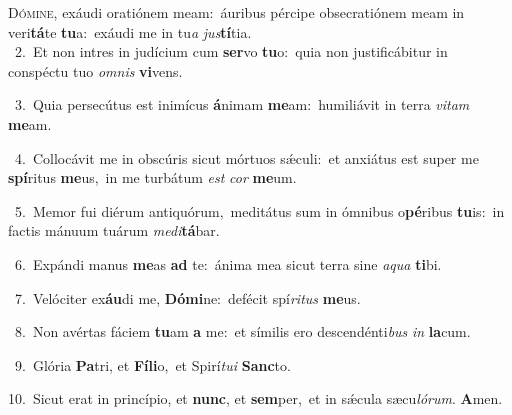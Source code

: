 \lettrine{\initial\textcolor{\initialcolor}{D}}{ómine,} exáudi oratiónem meam:~\dagger áuribus pércipe obsecratiónem meam in veri\-\textbf{tá}\-te \textbf{tu}\-a:~\star exáudi me in tu\textit{a} \textit{jus}\-\textbf{tí}tia.\\
{\numbfont\textcolor{\numbcolor}{~2.}}~Et non intres in judícium cum \textbf{ser}\-vo \textbf{tu}\-o:~\star quia non justificábitur in conspéctu tuo \textit{om}\-\textit{nis} \textbf{vi}\-vens.\par
{\numbfont\textcolor{\numbcolor}{~3.}}~Quia persecútus est inimícus \textbf{á}\-nimam \textbf{me}\-am:~\star humiliávit in terra \textit{vi}\-\textit{tam} \textbf{me}\-am.\par
{\numbfont\textcolor{\numbcolor}{~4.}}~Collocávit me in obscúris sicut mórtuos sǽculi:~\dagger et anxiátus est super me \textbf{spí}\-ritus \textbf{me}\-us,~\star in me turbátum \textit{est} \textit{cor} \textbf{me}\-um.\par
{\numbfont\textcolor{\numbcolor}{~5.}}~Memor fui diérum antiquórum,~\dagger meditátus sum in ómnibus o\-\textbf{pé}\-ribus \textbf{tu}\-is:~\star in factis mánuum tuárum \textit{me}\-\textit{di}\textbf{tá}bar.\par
{\numbfont\textcolor{\numbcolor}{~6.}}~Expándi manus \textbf{me}\-as \textbf{ad} te:~\star ánima mea sicut terra sine \textit{a}\-\textit{qua} \textbf{ti}\-bi.\par
{\numbfont\textcolor{\numbcolor}{~7.}}~Velóciter ex\-\textbf{áu}\-di me, \textbf{Dó}\-\textbf{mi}ne:~\star defécit spí\-\textit{ri}\-\textit{tus} \textbf{me}\-us.\par
{\numbfont\textcolor{\numbcolor}{~8.}}~Non avértas fáciem \textbf{tu}\-am \textbf{a} me:~\star et símilis ero descendénti\textit{bus} \textit{in} \textbf{la}\-cum.\par
{\numbfont\textcolor{\numbcolor}{~9.}}~Glória \textbf{Pa}\-tri, et \textbf{Fí}\-\textbf{li}o,~\star et Spirí\-\textit{tu}\-\textit{i} \textbf{Sanc}\-to.\par
{\numbfont\textcolor{\numbcolor}{10.}}~Sicut erat in princípio, et \textbf{nunc}\-, et \textbf{sem}\-per,~\star et in sǽcula sæcu\-\textit{ló}\-\textit{rum}. \textbf{A}\-men.\par
